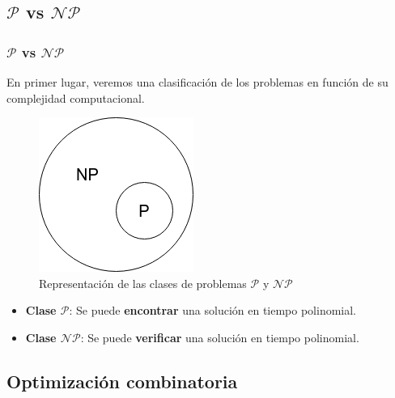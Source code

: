 \documentclass{beamer}
\begin{document}

\subsection{$\mathcal{P}$ vs $\mathcal{NP}$}

\begin{frame}
\frametitle{$\mathcal{P}$ vs $\mathcal{NP}$}

En primer lugar, veremos una clasificación de los problemas en función de su complejidad computacional.

\begin{figure}
    \centering
    \includegraphics[scale=0.5]{pres/img/introduccion/p-np.png}
    \caption{Representación de las clases de problemas $\mathcal{P}$ y $\mathcal{NP}$}
    \label{fig:p-np}
\end{figure}

\begin{itemize}
    \item \textbf{Clase $\mathcal{P}$}: Se puede \textbf{encontrar} una solución en tiempo polinomial.
    \item \textbf{Clase $\mathcal{NP}$}: Se puede \textbf{verificar} una solución en tiempo polinomial.
\end{itemize}

\end{frame}

\subsection{Optimización combinatoria}
\end{document}
